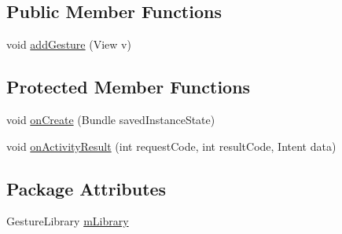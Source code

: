 \subsection*{\-Public \-Member \-Functions}
\begin{DoxyCompactItemize}
\item 
void \hyperlink{classcom_1_1openvision_1_1androidgesture_1_1_open_vision_gesture_a_aaefb608bb2eaa60a776790d2bfadc5b2}{add\-Gesture} (\-View v)
\end{DoxyCompactItemize}
\subsection*{\-Protected \-Member \-Functions}
\begin{DoxyCompactItemize}
\item 
void \hyperlink{classcom_1_1openvision_1_1androidgesture_1_1_open_vision_gesture_a_a6aac46c9881523b42753a5dd8b9c9af6}{on\-Create} (\-Bundle saved\-Instance\-State)
\item 
void \hyperlink{classcom_1_1openvision_1_1androidgesture_1_1_open_vision_gesture_a_ad03964962b8011fedae6cdfcf2fffb28}{on\-Activity\-Result} (int request\-Code, int result\-Code, \-Intent data)
\end{DoxyCompactItemize}
\subsection*{\-Package \-Attributes}
\begin{DoxyCompactItemize}
\item 
\-Gesture\-Library \hyperlink{classcom_1_1openvision_1_1androidgesture_1_1_open_vision_gesture_a_a2b0b06802f0a20591f9bff2ac648fb5b}{m\-Library}
\end{DoxyCompactItemize}


